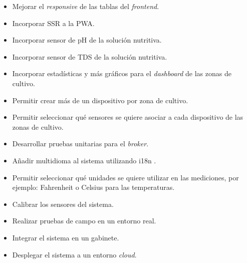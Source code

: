 \begin{itemize}
\item Mejorar el \emph{responsive} de las tablas del \emph{frontend}.
\item Incorporar SSR a la PWA.
\item Incorporar sensor de pH de la solución nutritiva.
\item Incorporar sensor de TDS de la solución nutritiva.
\item Incorporar estadísticas y más gráficos para el \emph{dashboard} de las zonas de cultivo.
\item Permitir crear más de un dispositivo por zona de cultivo.
\item Permitir seleccionar qué sensores se quiere asociar a cada dispositivo de las zonas de cultivo.
\item Desarrollar pruebas unitarias para el \emph{broker}.
\item Añadir multidioma al sistema utilizando i18n \citep{WEBSITE:ANGULARI18N}.
\item Permitir seleccionar qué unidades se quiere utilizar en las mediciones, por ejemplo: Fahrenheit o Celsius para las temperaturas.
\item Calibrar los sensores del sistema.
\item Realizar pruebas de campo en un entorno real.
\item Integrar el sistema en un gabinete.
\item Desplegar el sistema a un entorno \emph{cloud}.
\end{itemize}